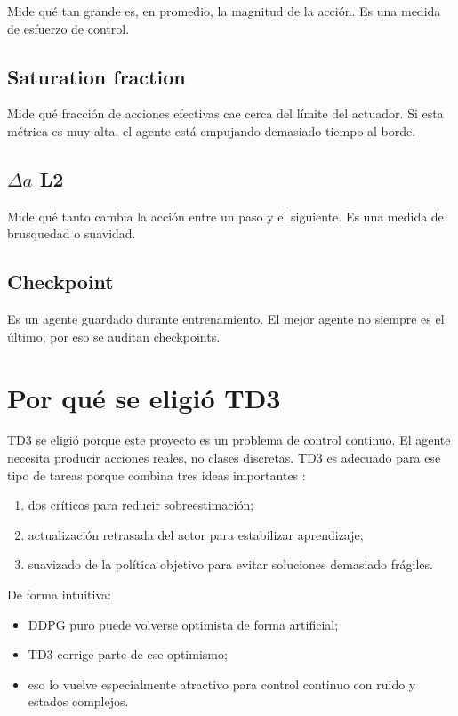 \documentclass[11pt,a4paper]{article}
\begin{document}
Mide qu\'e tan grande es, en promedio, la magnitud de la acci\'on. Es una medida de esfuerzo de control.

\subsection{Saturation fraction}

Mide qu\'e fracci\'on de acciones efectivas cae cerca del l\'imite del actuador. Si esta m\'etrica es muy alta, el agente est\'a empujando demasiado tiempo al borde.

\subsection{\(\Delta a\) L2}

Mide qu\'e tanto cambia la acci\'on entre un paso y el siguiente. Es una medida de brusquedad o suavidad.

\subsection{Checkpoint}

Es un agente guardado durante entrenamiento. El mejor agente no siempre es el \'ultimo; por eso se auditan checkpoints.

\section{Por qu\'e se eligi\'o TD3}

TD3 se eligi\'o porque este proyecto es un problema de control continuo. El agente necesita producir acciones reales, no clases discretas. TD3 es adecuado para ese tipo de tareas porque combina tres ideas importantes \citep{fujimoto2018td3,mathworks_td3_agent}:
\begin{enumerate}[leftmargin=1.2cm]
    \item dos cr\'iticos para reducir sobreestimaci\'on;
    \item actualizaci\'on retrasada del actor para estabilizar aprendizaje;
    \item suavizado de la pol\'itica objetivo para evitar soluciones demasiado fr\'agiles.
\end{enumerate}

De forma intuitiva:
\begin{itemize}[leftmargin=1.2cm]
    \item DDPG puro puede volverse optimista de forma artificial;
    \item TD3 corrige parte de ese optimismo;
    \item eso lo vuelve especialmente atractivo para control continuo con ruido y estados complejos.
\end{itemize}
\end{document}

